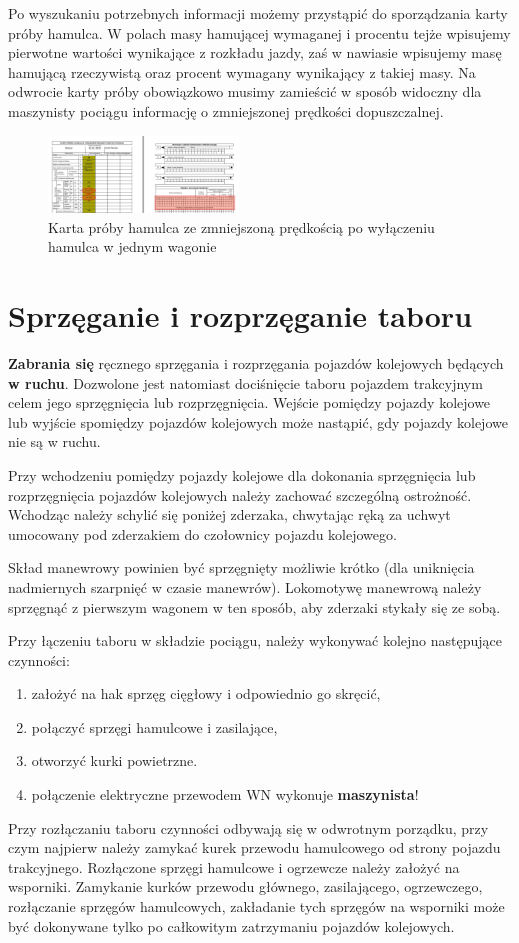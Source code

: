 Po wyszukaniu potrzebnych informacji możemy przystąpić do sporządzania karty próby hamulca. W polach masy hamującej wymaganej i procentu tejże wpisujemy pierwotne wartości wynikające z rozkładu jazdy, zaś w nawiasie wpisujemy masę hamującą rzeczywistą oraz procent wymagany wynikający z takiej masy. Na odwrocie karty próby obowiązkowo musimy zamieścić w sposób widoczny dla maszynisty pociągu informację o zmniejszonej prędkości dopuszczalnej.
\begin{figure}
	\includegraphics[width=0.45\textwidth]{skryptkierownik-img/karta-proby-wylaczony-hamulec.jpg}
	\caption{Karta próby hamulca ze zmniejszoną prędkością po wyłączeniu hamulca w jednym wagonie}
\end{figure}


\chapter{Sprzęganie i rozprzęganie taboru}

\textbf{Zabrania się} ręcznego sprzęgania i rozprzęgania pojazdów kolejowych będących \textbf{w ruchu}. Dozwolone jest natomiast dociśnięcie taboru pojazdem trakcyjnym celem jego sprzęgnięcia lub rozprzęgnięcia. Wejście pomiędzy pojazdy kolejowe lub wyjście spomiędzy pojazdów kolejowych może nastąpić, gdy pojazdy kolejowe nie są w ruchu. 

Przy wchodzeniu pomiędzy pojazdy kolejowe dla dokonania sprzęgnięcia lub rozprzęgnięcia pojazdów kolejowych należy zachować szczególną ostrożność. Wchodząc należy schylić się poniżej zderzaka, chwytając ręką za uchwyt umocowany pod zderzakiem do czołownicy pojazdu kolejowego. 

Skład manewrowy powinien być sprzęgnięty możliwie krótko (dla uniknięcia nadmiernych szarpnięć w czasie manewrów). Lokomotywę manewrową należy sprzęgnąć z pierwszym wagonem w ten sposób, aby zderzaki stykały się ze sobą. 

Przy łączeniu taboru w składzie pociągu, należy wykonywać kolejno następujące czynności: 

\begin{enumerate}
	\item założyć na hak sprzęg cięgłowy i odpowiednio go skręcić, 
	\item połączyć sprzęgi hamulcowe i zasilające, 
	\item otworzyć kurki powietrzne.
	\item połączenie elektryczne przewodem WN wykonuje \textbf{maszynista}!
\end{enumerate}
Przy rozłączaniu taboru czynności odbywają się w odwrotnym porządku, przy czym najpierw należy zamykać kurek przewodu hamulcowego od strony pojazdu trakcyjnego. Rozłączone sprzęgi hamulcowe i ogrzewcze należy założyć na wsporniki. Zamykanie kurków przewodu głównego, zasilającego, ogrzewczego, rozłączanie sprzęgów hamulcowych, zakładanie tych sprzęgów na wsporniki może być dokonywane tylko po całkowitym zatrzymaniu pojazdów kolejowych. 

